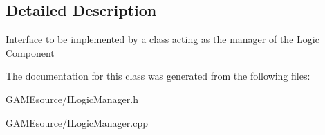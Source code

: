 \subsection{Detailed Description}
Interface to be implemented by a class acting as the manager of the Logic Component 

The documentation for this class was generated from the following files\+:\begin{DoxyCompactItemize}
\item 
G\+A\+M\+Esource/I\+Logic\+Manager.\+h\item 
G\+A\+M\+Esource/I\+Logic\+Manager.\+cpp\end{DoxyCompactItemize}
